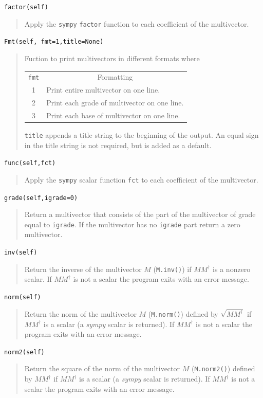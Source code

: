 \documentclass[12pt,twoside,openright]{memoir}
\newcommand{\R}{\dagger}
\newcommand{\T}[1]{\texttt{#1}}
\begin{document}
\T{factor(self)}
\begin{quote}
   Apply the \T{sympy} \T{factor} function to each coefficient of the multivector.
\end{quote}

\T{Fmt(self, fmt=1,title=None)}
\begin{quote}
	Fuction to print multivectors in different formats where
	\begin{center}
	\begin{tabular}{cl}
	\T{fmt} & \multicolumn{1}{c}{Formatting} \\
	1 & Print entire multivector on one line. \\
	2 & Print each grade of multivector on one line.\\
	3 & Print each base of multivector on one line.
	\end{tabular}	
	\end{center}
	\T{title} appends a title string to the beginning of the output.  An equal sign in
	the title string is not required, but is added as a default.
\end{quote}

\T{func(self,fct)}
\begin{quote}
   Apply the \T{sympy} scalar function \T{fct} to each coefficient of the multivector.
\end{quote}

\T{grade(self,igrade=0)}
\begin{quote}
    Return a multivector that consists of the part of the multivector of
    grade equal to \T{igrade}.  If the multivector has no \T{igrade} part
    return a zero multivector.
\end{quote}

\T{inv(self)}
\begin{quote}
   Return the inverse of the multivector $M$ (\T{M.inv()}) if $MM^{\R}$ is a nonzero scalar.  If $MM^{\R}$
   is not a scalar the program exits with an error message.
\end{quote}

\T{norm(self)}
\begin{quote}
   Return the norm of the multivector $M$ (\T{M.norm()}) defined by $\sqrt{MM^{\R}}$ if $MM^{\R}$ is a scalar (a \emph{sympy} scalar 
   is returned).  If $MM^{\R}$ is not a scalar the program exits with an error message.
\end{quote}

\T{norm2(self)}
\begin{quote}
   Return the square of the norm of the multivector $M$ (\T{M.norm2()}) defined by $MM^{\R}$ if $MM^{\R}$ is a scalar (a \emph{sympy} scalar 
   is returned).  If $MM^{\R}$ is not a scalar the program exits with an error message.
\end{quote}
\end{document}
